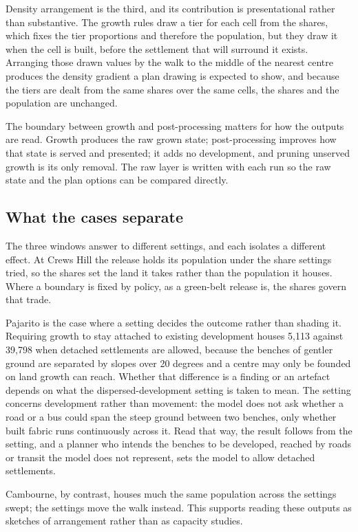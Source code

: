 \documentclass[11pt]{article}
\begin{document}
Density arrangement is the third, and its contribution is
presentational rather than substantive. The growth rules draw a tier for each cell
from the shares, which fixes the tier proportions and therefore the population, but
they draw it when the cell is built, before the settlement that will
surround it exists. Arranging those drawn values by the walk to the middle
of the nearest centre produces the density gradient a plan drawing is
expected to show, and because the tiers are dealt from the same shares
over the same cells, the shares and the population are unchanged.

The boundary between growth and post-processing matters for how the
outputs are read. Growth produces
the raw grown state; post-processing improves how that state is served and
presented; it adds no development, and pruning unserved growth is its
only removal. The raw layer is written with each run so the raw state
and the plan options can be compared directly.

\subsection{What the cases separate}

The three windows answer to different settings, and each isolates a
different effect. At Crews Hill the release holds its population under
the share settings tried, so the shares set the land it takes rather than
the population it houses. Where
a boundary is fixed by policy, as a green-belt release is, the shares
govern that trade.

Pajarito is the case where a setting decides the outcome rather than
shading it. Requiring growth to stay attached to existing development
houses 5{,}113 against 39{,}798 when detached settlements are allowed,
because the benches of gentler ground are separated by slopes over 20
degrees and a centre may only be founded on land growth can reach.
Whether that difference is a finding or an artefact depends on what the
dispersed-development setting is taken to mean. The setting concerns
development rather than movement: the model does not ask whether a road
or a bus could span the steep ground between two benches, only whether
built fabric runs continuously across it. Read that way, the result
follows from the setting, and a planner who intends the benches to be
developed, reached by roads or transit the model does not represent,
sets the model to allow detached settlements.

Cambourne, by contrast, houses much the same population across the
settings swept; the settings move the walk instead. This supports
reading these outputs as sketches of arrangement rather than as
capacity studies.
\end{document}
